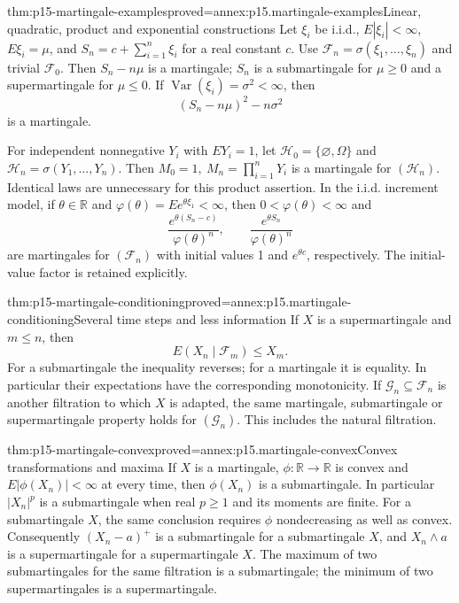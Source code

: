 \begin{hbtheorem}{thm:p15-martingale-examples}{proved=annex:p15.martingale-examples}{Linear, quadratic, product and exponential constructions}
Let \(\xi_i\) be i.i.d., \(E|\xi_i|<\infty\), \(E\xi_i=\mu\), and
\(S_n=c+\sum_{i=1}^n\xi_i\) for a real constant \(c\).
Use \(\mathcal F_n=\sigma(\xi_1,\ldots,\xi_n)\) and trivial \(\mathcal F_0\).
Then \(S_n-n\mu\) is a martingale; \(S_n\) is a submartingale for
\(\mu\geq0\) and a supermartingale for \(\mu\leq0\).
If \(\operatorname{Var}(\xi_i)=\sigma^2<\infty\), then
\[
                              (S_n-n\mu)^2-n\sigma^2
\]
is a martingale.

For independent nonnegative \(Y_i\) with \(EY_i=1\), let
\(\mathcal H_0=\{\varnothing,\Omega\}\) and
\(\mathcal H_n=\sigma(Y_1,\ldots,Y_n)\).
Then \(M_0=1,\ M_n=\prod_{i=1}^nY_i\) is a martingale for \((\mathcal H_n)\).
Identical laws are unnecessary for this product assertion.
In the i.i.d. increment model, if \(\theta\in\mathbb R\) and
\(\varphi(\theta)=E e^{\theta\xi_1}<\infty\), then
\(0<\varphi(\theta)<\infty\) and
\[
              \frac{e^{\theta(S_n-c)}}{\varphi(\theta)^n},
              \qquad
              \frac{e^{\theta S_n}}{\varphi(\theta)^n}
\]
are martingales for \((\mathcal F_n)\) with initial values 1 and
\(e^{\theta c}\), respectively.
The initial-value factor is retained explicitly.
\end{hbtheorem}

\begin{hbtheorem}{thm:p15-martingale-conditioning}{proved=annex:p15.martingale-conditioning}{Several time steps and less information}
If \(X\) is a supermartingale and \(m\leq n\), then
\[
                              E(X_n\mid\mathcal F_m)\leq X_m.
\]
For a submartingale the inequality reverses; for a martingale it is equality.
In particular their expectations have the corresponding monotonicity.
If \(\mathcal G_n\subseteq\mathcal F_n\) is another filtration to which
\(X\) is adapted, the same martingale, submartingale or supermartingale
property holds for \((\mathcal G_n)\). This includes the natural filtration.
\end{hbtheorem}

\begin{hbtheorem}{thm:p15-martingale-convex}{proved=annex:p15.martingale-convex}{Convex transformations and maxima}
If \(X\) is a martingale, \(\phi:\mathbb R\to\mathbb R\) is convex and
\(E|\phi(X_n)|<\infty\) at every time, then \(\phi(X_n)\) is a
submartingale. In particular \(|X_n|^p\) is a submartingale when
real \(p\geq1\) and its moments are finite.
For a submartingale \(X\), the same conclusion requires \(\phi\)
nondecreasing as well as convex.
Consequently \((X_n-a)^+\) is a submartingale for a submartingale \(X\),
and \(X_n\wedge a\) is a supermartingale for a supermartingale \(X\).
The maximum of two submartingales for the same filtration is a
submartingale; the minimum of two supermartingales is a supermartingale.
\end{hbtheorem}

